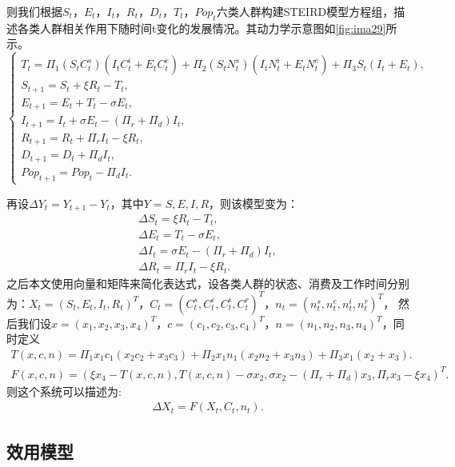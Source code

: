 则我们根据$S_t$，$E_t$，$I_t$，$R_t$，$D_t$，$T_t$，$Pop_t$六类人群构建STEIRD模型方程组，描述各类人群相关作用下随时间t变化的发展情况。其动力学示意图如\autoref{fig:ima29}所示。
\begin{equation}\label{seir}
    \left\{
    \begin{array}{ll}
    T_t = \Pi_1(S_t C_{t}^{s})(I_t C_{t}^{i}+E_t C_{t}^{e}) + \Pi_2(S_t N_{t}^{s})(I_t N_{t}^{i}+E_t N_{t}^{e}) + \Pi_3 S_{t}(I_{t}+E_{t}), \\
    S_{t+1}=S_{t} + \xi R_{t} -T_{t} ,   \\  %
    E_{t+1}=E_{t}+T_{t}-\sigma E_t ,  \\  %
    I_{t+1}=I_{t}+\sigma E_t- (\Pi_r+\Pi_d)I_{t} ,  \\  %
    R_{t+1}=R_{t}+\Pi_r I_t - \xi R_{t} , \\ %
    D_{t+1}=D_{t}+\Pi_d I_t , \\
    Pop_{t+1}=Pop_{t} - \Pi_d I_t .
    \end{array}
    \right.
\end{equation}

再设$\Delta Y_t= Y_{t+1}-Y_{t}$，其中$Y=S,E,I,R$，则该模型变为：
\begin{align*}
    \Delta S_t=\xi R_{t} -T_{t}, \\
    \Delta E_t=T_{t}-\sigma E_t, \\
    \Delta I_t=\sigma E_t- (\Pi_r+\Pi_d)I_{t}, \\
    \Delta R_t=\Pi_r I_t - \xi R_{t}.
\end{align*}
之后本文使用向量和矩阵来简化表达式，设各类人群的状态、消费及工作时间分别为：$X_t=(S_t,E_t,I_t,R_t)^T$，$C_t=(C_{t}^{s},C_{t}^{e},C_{t}^{i},C_{t}^{r})^T$，$n_t=(n_{t}^{s},n_{t}^{e},n_{t}^{i},n_{t}^{r})^T$，
然后我们设$x=(x_1,x_2,x_3,x_4)^T$，$c=(c_1,c_2,c_3,c_4)^T$，$n=(n_1,n_2,n_3,n_4)^T$，同时定义
\begin{align}
    T(x,c,n)=\Pi_1x_1c_1(x_2c_2+x_3c_3)+\Pi_2x_1n_1(x_2n_2+x_3n_3)+\Pi_3x_1(x_2+x_3).
\end{align}
\begin{align}
    F(x,c,n)=(\xi x_4-T(x,c,n),T(x,c,n)-\sigma x_2, \sigma x_2-(\Pi_r+\Pi_d)x_3,\Pi_r x_3-\xi x_4)^T.
\end{align}
则这个系统可以描述为:
\begin{align}
    \Delta X_t=F(X_t,C_t,n_t).
\end{align}
\subsection{效用模型}
